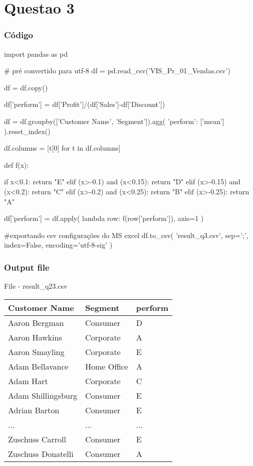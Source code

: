 \chapter{Questao 3}

\subsection*{Código}

\begin{python}
import pandas as pd

# pré convertido para utf-8
df = pd.read_csv('VIS_Pr_01_Vendas.csv')

df = df.copy()

df['perform']  = df['Profit']/(df['Sales']-df['Discount'])

df = df.groupby(['Customer Name', 'Segment']).agg(
    {'perform': ['mean']}
).reset_index()

df.columns = [t[0] for t in df.columns]


def f(x):
    
    if x<0.1:
        return "E"
    elif (x>-0.1) and (x<0.15):
        return "D"
    elif (x>-0.15) and (x<0.2):
        return "C"
    elif (x>-0.2) and (x<0.25):
        return "B"
    elif (x>-0.25):
        return "A"


df['perform'] = df.apply(
    lambda row: f(row['perform']),
    axis=1
)


#exportando csv configurações do MS excel
df.to_csv(
    'result_q3.csv',
    sep=';',
    index=False,
    encoding='utf-8-sig'
)
    
\end{python}


\subsection*{Output file}


\begin{quadro}[htb]
	\caption{File - result\_q23.csv}
    \begin{tabular}{|l|l|l|}
		\hline
        Customer Name & Segment & perform \\ \hline
        Aaron Bergman & Consumer & D \\ \hline
        Aaron Hawkins & Corporate & A \\ \hline
        Aaron Smayling & Corporate & E \\ \hline
        Adam Bellavance & Home Office & A \\ \hline
        Adam Hart & Corporate & C \\ \hline
        Adam Shillingsburg & Consumer & E \\ \hline
        Adrian Barton & Consumer & E \\ \hline
        ... & ... & ... \\ \hline
        Zuschuss Carroll & Consumer & E \\ \hline
        Zuschuss Donatelli & Consumer & A \\ \hline
	\end{tabular}
	\end{quadro}

